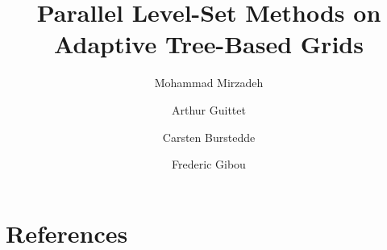\documentclass[final]{elsarticle}
\begin{document}
\title{Parallel Level-Set Methods on Adaptive Tree-Based Grids}

\address[MECHE]{Department of Mechanical Engineering, University of California, Santa Barbara, CA 93106-5070, United States.}
\address[CS]{Department of Computer Science, University of California, Santa Barbara, CA 93106-5110, United States.}
\address[UBONN]{Institute for Numerical Simulation, University of Bonn, 53115 Bonn, Germany.}

\author[MECHE]{Mohammad Mirzadeh} \author[MECHE]{Arthur Guittet} \author[UBONN] {Carsten Burstedde} \author[MECHE,CS]{Frederic Gibou}









\section*{References}


\end{document}
